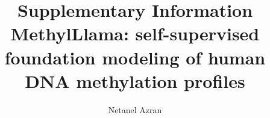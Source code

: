 \documentclass[11pt]{article}
\title{Supplementary Information\\
MethylLlama: self-supervised foundation modeling of human DNA methylation profiles}
\author{Netanel Azran}
\date{}
\begin{document}
\maketitle
\onehalfspacing

\end{document}
